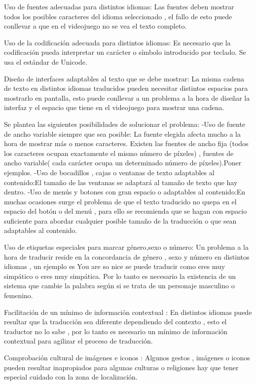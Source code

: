 Uso de fuentes adecuadas para distintos idiomas: Las fuentes deben mostrar todos los posibles caracteres del idioma seleccionado , el fallo de esto puede conllevar a que en el videojuego no se vea el texto completo.

Uso de la codificación adecuada para distintos idiomas: Es necesario que la codificación pueda interpretar un carácter o símbolo introducido por teclado. Se usa el estándar de Unicode.

Diseño de interfaces adaptables al texto que se debe mostrar: La misma cadena de texto en distintos idiomas traducidos pueden necesitar distintos espacios para mostrarlo en pantalla, esto puede conllevar a un problema a la hora de diseñar la interfaz y el espacio que tiene en el videojuego para mostrar una cadena.

Se plantea las siguientes posibilidades de solucionar el problema:
-Uso de fuente de ancho variable siempre que sea posible: 
La fuente elegida afecta mucho a la hora de mostrar más o menos caracteres. Existen las fuentes de ancho fija (todos los caracteres ocupan exactamente el mismo número de píxeles) , fuentes de ancho variable( cada carácter ocupa un determinado número de píxeles).Poner ejemplos.
-Uso de bocadillos , cajas o ventanas de texto adaptables al contenido:El tamaño de las ventanas se adaptará al tamaño de texto que hay dentro.
-Uso de menús y botones con gran espacio o adaptables al contenido:En muchas ocasiones surge el problema de que el texto traducido no quepa en el espacio del botón o del menú , para ello se recomienda que se hagan con espacio suficiente para abordar cualquier posible tamaño de la traducción o que sean adaptables al contenido.

Uso de etiquetas especiales para marcar género,sexo o número: Un problema a la hora de traducir reside en la concordancia de género , sexo y número en distintos idiomas , un ejemplo es You are so nice se puede traducir como eres muy simpático o eres muy simpática. Por lo tanto es necesario la existencia de un sistema que cambie la palabra según si se trata de un personaje masculino o femenino.

Facilitación de un mínimo de información contextual : En distintos idiomas puede resultar que la traducción sea diferente dependiendo del contexto , esto el traductor no lo sabe , por lo tanto es necesario un mínimo de información contextual para agilizar el proceso de traducción.

Comprobación cultural de imágenes e iconos : Algunos gestos , imágenes o iconos pueden resultar inapropiados para algunas culturas o religiones hay que tener especial cuidado con la zona de localización.

